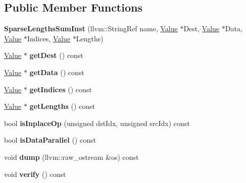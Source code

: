 \subsection*{Public Member Functions}
\begin{DoxyCompactItemize}
\item 
\mbox{\label{classglow_1_1_sparse_lengths_sum_inst_a019073273d57662ae36b49fb01a1d82f}} 
{\bfseries Sparse\+Lengths\+Sum\+Inst} (llvm\+::\+String\+Ref name, \hyperlink{classglow_1_1_value}{Value} $\ast$Dest, \hyperlink{classglow_1_1_value}{Value} $\ast$Data, \hyperlink{classglow_1_1_value}{Value} $\ast$Indices, \hyperlink{classglow_1_1_value}{Value} $\ast$Lengths)
\item 
\mbox{\label{classglow_1_1_sparse_lengths_sum_inst_af9e21ba5c7d6f74a977c04d9894cf7dc}} 
\hyperlink{classglow_1_1_value}{Value} $\ast$ {\bfseries get\+Dest} () const
\item 
\mbox{\label{classglow_1_1_sparse_lengths_sum_inst_a40cfce0249304b9024f317991b251cc2}} 
\hyperlink{classglow_1_1_value}{Value} $\ast$ {\bfseries get\+Data} () const
\item 
\mbox{\label{classglow_1_1_sparse_lengths_sum_inst_a41dde7c749e8df412981cf5114469da0}} 
\hyperlink{classglow_1_1_value}{Value} $\ast$ {\bfseries get\+Indices} () const
\item 
\mbox{\label{classglow_1_1_sparse_lengths_sum_inst_aae34628fa0e0c33eb192a4347da43688}} 
\hyperlink{classglow_1_1_value}{Value} $\ast$ {\bfseries get\+Lengths} () const
\item 
\mbox{\label{classglow_1_1_sparse_lengths_sum_inst_a43cf19ea01d86f577cd09395e98fe70d}} 
bool {\bfseries is\+Inplace\+Op} (unsigned dst\+Idx, unsigned src\+Idx) const
\item 
\mbox{\label{classglow_1_1_sparse_lengths_sum_inst_ad960cadf2666dc2398fb3dfade6924cd}} 
bool {\bfseries is\+Data\+Parallel} () const
\item 
\mbox{\label{classglow_1_1_sparse_lengths_sum_inst_a27da2b7e78e91c3e07a0683f20e2d0df}} 
void {\bfseries dump} (llvm\+::raw\+\_\+ostream \&os) const
\item 
\mbox{\label{classglow_1_1_sparse_lengths_sum_inst_aebd3026a2c6b08e337e7114e21766d62}} 
void {\bfseries verify} () const
\end{DoxyCompactItemize}
